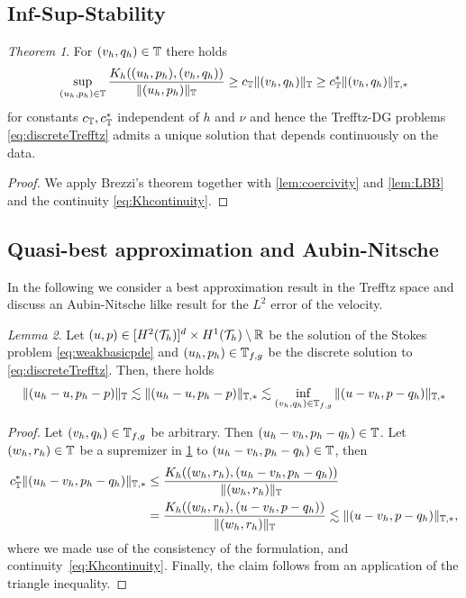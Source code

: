 \documentclass[sn-mathphys,Numbered]{sn-jnl}%
\theoremstyle{remark}%
\newtheorem{theorem}{Theorem}%
\newtheorem{lemma}[theorem]{Lemma}
\theoremstyle{definition}%
\begin{document}
\subsection{Inf-Sup-Stability}
\begin{theorem} \label{th:Khinfsup}
  For $(v_h,q_h) \in \mathbb{T}$ there holds
  \begin{equation}
    \sup_{(u_h,p_h) \in \mathbb{T}} \frac{K_h((u_h,p_h),(v_h,q_h))}{\Vert (u_h,p_h) \Vert_{\mathbb{T}} } \geq c_{\mathbb{T}} \Vert (v_h,q_h) \Vert_{\mathbb{T}} \geq c_{\mathbb{T}}^\ast \Vert (v_h,q_h) \Vert_{\mathbb{T},\ast}
  \end{equation}
  for constants $c_{\mathbb{T}}, c_{\mathbb{T}}^\ast$ independent of $h$ and $\nu$ and hence the Trefftz-DG problems \eqref{eq:discreteTrefftz} admits a unique solution that depends continuously on the data. 
\end{theorem}
\begin{proof}
 We apply Brezzi's theorem together with \cref{lem:coercivity} and \cref{lem:LBB} and the continuity \eqref{eq:Khcontinuity}.
\end{proof}

\subsection{Quasi-best approximation and Aubin-Nitsche}
In the following we consider a best approximation result in the Trefftz space and discuss
an Aubin-Nitsche lilke result for the $L^2$ error of the velocity.
\begin{lemma}
  Let $(u,p) \in [H^{2}({\mathcal{T}_h})]^d \times H^{1}({\mathcal{T}_h}) \setminus \mathbb{R}$ be the solution of the Stokes problem \eqref{eq:weakbasicpde} and $(u_h,p_h) \in \mathbb{T}_{f,g}$ be the discrete solution to \eqref{eq:discreteTrefftz}. Then, there holds
  \begin{equation}
    \Vert (u_h-u,p_h-p) \Vert_{\mathbb{T}} \lesssim \Vert (u_h-u,p_h-p) \Vert_{\mathbb{T},\ast} \lesssim \inf_{(v_h,q_h) \in \mathbb{T}_{f,g}} \Vert (u-v_h,p-q_h) \Vert_{\mathbb{T},\ast}
  \end{equation}
\end{lemma}
\begin{proof} Let $(v_h,q_h) \in \mathbb{T}_{f,g}$ be arbitrary. Then $(u_h-v_h,p_h-q_h) \in \mathbb{T}$. 
  Let $(w_h,r_h) \in \mathbb{T}$ be a supremizer in \cref{th:Khinfsup} to $(u_h-v_h,p_h-q_h) \in \mathbb{T}$, then
  \begin{align*}
    c_{\mathbb{T}}^\ast  \Vert (u_h-v_h,p_h-q_h) \Vert_{\mathbb{T},\ast} & \leq \frac{K_h((w_h,r_h),(u_h-v_h,p_h-q_h))}{\Vert (w_h,r_h) \Vert_{\mathbb{T}} } \\ & = \frac{K_h((w_h,r_h),(u-v_h,p-q_h))}{\Vert (w_h,r_h) \Vert_{\mathbb{T}} }
    \lesssim \Vert (u-v_h,p-q_h) \Vert_{\mathbb{T},\ast},
  \end{align*}
  where we made use of the consistency of the formulation, and continuity~\eqref{eq:Khcontinuity}. Finally, the claim follows from an application of the triangle inequality.
\end{proof}
\end{document}

